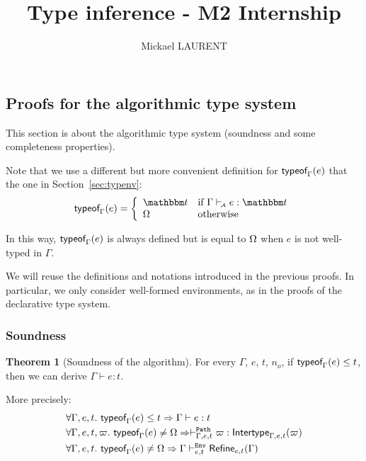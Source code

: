 \documentclass[a4paper]{article}
\title{\vspace{1.5cm}Type inference - M2 Internship}
\author{Mickael LAURENT}
\date{\vspace{-5ex}}
\theoremstyle{definition}
\newtheorem{theorem}{Theorem}
\begin{document}
  \maketitle

  \subsection{Proofs for the algorithmic type system}

  This section is about the algorithmic type system (soundness and some completeness properties).

  Note that we use a different but more convenient definition for $\textsf{typeof}_{\Gamma}(e)$ that the one
  in Section~\ref{sec:typenv}:
  \begin{align*}
    \tyof e \Gamma = 
    \left\{\begin{array}{ll}
      \ts & \text{if } \Gamma \vdashA e:\ts \\
      \tsempty & \text{otherwise}
    \end{array}\right.
  \end{align*}

  In this way, $\textsf{typeof}_{\Gamma}(e)$ is always defined but is equal to $\Omega$ when $e$ is not
  well-typed in $\Gamma$. 

  We will reuse the definitions and notations introduced in the previous proofs.
  In particular, we only consider well-formed environments, as in the proofs of the declarative type system.

  \subsubsection{Soundness}

  \begin{theorem}[Soundness of the algorithm]
    For every $\Gamma$, $e$, $t$, $n_o$, if $\textsf{typeof}_{\Gamma}(e) \leq t$, then we can derive $\Gamma \vdash e:t$.

    More precisely:
    \begin{align*}
      &\forall \Gamma, e, t.\ \textsf{typeof}_{\Gamma}(e) \leq t \Rightarrow \Gamma \vdash e:t\\
      &\forall \Gamma, e, t, \varpi.\ \textsf{typeof}_{\Gamma}(e) \neq \Omega \Rightarrow \vdash^{\texttt{Path}}_{\Gamma,e,t} \varpi:\textsf{Intertype}_{\Gamma,e,t} (\varpi)\\
      &\forall \Gamma, e, t.\ \textsf{typeof}_{\Gamma}(e) \neq \Omega \Rightarrow \Gamma \vdash^{\texttt{Env}}_{e,t} \textsf{Refine}_{e,t}(\Gamma)
    \end{align*}
  \end{theorem}
\end{document}
